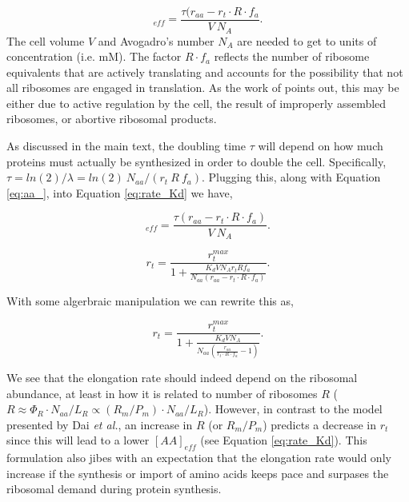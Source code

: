 \begin{equation}
[AA]_{eff} =  \frac{\tau (r_{aa} - r_t \cdot R \cdot f_a }{V \ N_A}.
\label{eq:aa_}
\end{equation}
The cell volume $V$ and Avogadro's number $N_A$ are needed to get to units of
concentration (i.e. mM). The factor $R \cdot f_a$ reflects the number of
ribosome equivalents that are actively translating and accounts for the
possibility that not all ribosomes are engaged in translation. As the work of
\citep{dai2016} points out, this may be either due to active regulation by the
cell, the result of improperly assembled ribosomes, or abortive ribosomal
products.

As discussed in the main text, the doubling time $\tau$ will depend on how much proteins
must actually be synthesized in order to double the cell. Specifically, $\tau = ln(2)/\lambda =
ln(2) \ N_{aa} / (r_t \ R \ f_a)$. Plugging this, along with Equation \ref{eq:aa_}, into Equation \ref{eq:rate_Kd} we have,

\begin{equation}
[AA]_{eff} =  \frac{\tau (r_{aa} - r_t \cdot R \cdot f_a)}{V \ N_A}.
\label{eq:aa_}
\end{equation}

\begin{equation}
r_t = \frac{r_t^{max}}{1 + \frac{K_d V N_A r_t R f_a}{N_{aa} (r_{aa} - r_t \cdot R \cdot f_a)}}.
\label{eq:rate_Kd_full}
\end{equation}

With some algerbraic manipulation we can rewrite this as,

\begin{equation}
r_t =  \frac{r_t^{max}}{1 + \frac{K_d V N_A }{N_{aa} (\frac{r_{aa}}{r_t \cdot R \cdot f_a} - 1)}}.
\label{eq:rate_Kd_full2}
\end{equation}

We see that the elongation rate should indeed depend on the ribosomal abundance,
at least in how it is related to number of ribosomes $R$ ($R \approx \Phi_R
\cdot N_{aa}/ L_R \propto (R_m/P_m) \cdot N_{aa}/ L_R$). However, in contrast to
the model presented by Dai \textit{et al.}, an increase in $R$ (or $R_m/P_m$)
predicts a decrease in $r_t$ since this will lead to a lower $[AA]_{eff}$ (see
Equation \ref{eq:rate_Kd}). This formulation also jibes with an expectation that
the elongation rate would only increase if the synthesis or import of amino
acids keeps pace and surpases the ribosomal demand during protein synthesis.

